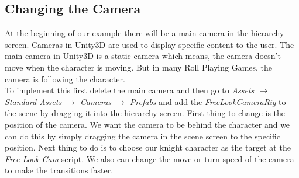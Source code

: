 \documentclass[12pt, a4paper, titlepage]{article}
\begin{document}
\subsection{Changing the Camera}

At the beginning of our example there will be a main camera in the hierarchy screen. Cameras in Unity3D are used to display specific content to the user. The main camera in Unity3D is a static camera which means, the camera doesn't move when the character is moving. But in many Roll Playing Games, the camera is following the character. \\
To implement this first delete the main camera and then go to \emph{Assets $\rightarrow$ Standard Assets $\rightarrow$ Cameras $\rightarrow$ Prefabs} and add the \emph{FreeLookCameraRig} to the scene by dragging it into the hierarchy screen. First thing to change is the position of the camera. We want the camera to be behind the character and we can do this by simply dragging the camera in the scene screen to the specific position. Next thing to do is to choose our knight character as the target at the \emph{Free Look Cam} script.  We also can change the move or turn speed of the camera to make the transitions faster.
\end{document}
